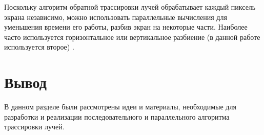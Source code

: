 Поскольку алгоритм обратной трассировки лучей обрабатывает каждый пиксель экрана независимо, можно использовать параллельные вычисления для уменьшения времени его работы, разбив экран на некоторые части. Наиболее часто используется горизонтальное или вертикальное разбиение (в данной работе используется второе) \cite{article_paral}.


\section*{Вывод}
В данном разделе были рассмотрены идеи и материалы, необходимые для разработки и реализации последовательного и параллельного алгоритма трассировки лучей.

